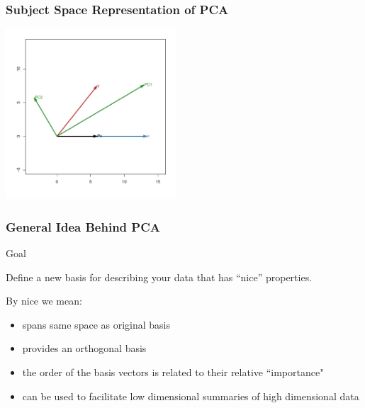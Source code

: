 \documentclass{beamer}
\begin{document}
\begin{frame}
  \frametitle{Subject Space Representation of PCA}

\begin{center}
\includegraphics[height=2.5in]{fig-bivariate-pca-vectors.pdf}
\smallskip


\end{center}  

\end{frame}




\begin{frame}
  \frametitle{General Idea Behind PCA}


\begin{block}{Goal}

Define a new basis for describing your data that has ``nice'' properties.

\end{block}
\medskip

By nice we mean:
\begin{itemize}
    \item spans same space as original basis
    \item provides an orthogonal basis
    \item the order of the basis vectors is related to their relative ``importance"
    \item can be used to facilitate low dimensional summaries of high dimensional data
\end{itemize}


\end{frame}

\end{document}
